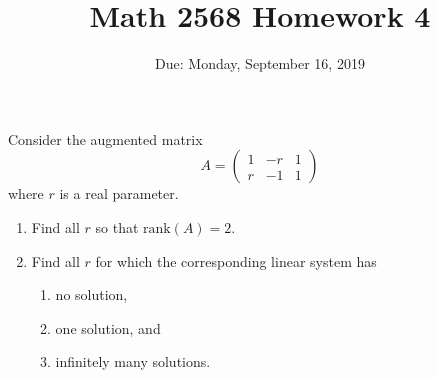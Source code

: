 \documentclass{article}
\title{Math 2568 Homework 4}
\author{\phantom{Dr. Golubitsky}}
\date{Due: Monday, September 16, 2019}
\begin{document}
\maketitle


\problemlabel



\begin{exercise}  \label{A:2.4.2}
Consider the augmented matrix 
\[
A=\left(\begin{array}{cc|c}  
 1 & -r & 1\\  
 r & -1 & 1  
\end{array}\right)
\]
where $r$ is a real parameter. 
\begin{enumerate}
\item Find all $r$ so that $\text{rank}(A)=2$.

\item Find all $r$ for which the corresponding linear system has 
\begin{enumerate}
\item no solution, 
\item one solution, and 
\item infinitely many solutions.
\end{enumerate}
\end{enumerate}


\end{exercise}
\end{document}
